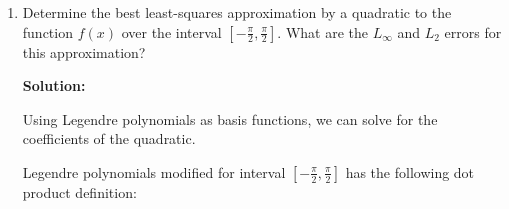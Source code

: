 \documentclass[conference,onecolumn]{IEEEtran}
\begin{document}
\begin{enumerate}[label=\arabic{enumi}.]
\begin{enumerate}
                        For $n = 2$:
                        \begin{align*}
                              \begin{cases}
                                    p_2(x)   & \approx - 0.500004924940155 + 0.724609736054229 x + 1.9960030637173 \times 10^{-6} x^2 \approx 0.724609736054229 x - 0.5 \\
                                    L_\infty & \approx 0.13822185392370312                                                                                              \\
                                    L_2      & \approx 0.170396982005513
                              \end{cases}
                        \end{align*}

                        For $n = 3$:

                        Its error change does not converge to $< 10^{-5}$ in 1000 iterations
                        \begin{align*}
                              \begin{cases}
                                    p_3(x)   & \approx - 0.5000619896739 + 0.985440080596674 x + 0.000139910675817895 x^2 + 0.142443200483762 x^3 \\
                                    L_\infty & \approx 0.004793777898904783                                                                       \\
                                    L_2      & \approx 0.00568482890288639
                              \end{cases}
                        \end{align*}
                  \item Determine the best least-squares approximation by a quadratic to the function $f (x)$ over the interval $[-\frac{\pi}{2}, \frac{\pi}{2}]$.
                        What are the $L_{\infty}$ and $L_2$ errors for this approximation?

                        \textbf{Solution:}

                        Using Legendre polynomials as basis functions, we can solve for the coefficients of the quadratic.

                        Legendre polynomials modified for interval $[-\frac{\pi}{2}, \frac{\pi}{2}]$ has the following dot product definition:


\end{enumerate}
\end{enumerate}
\end{document}
